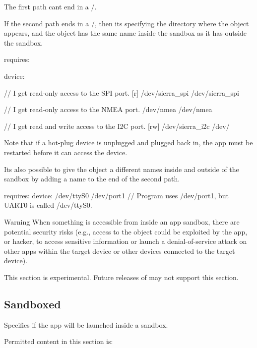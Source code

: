The first path can\textquotesingle{}t end in a \textquotesingle{}/\textquotesingle{}.

If the second path ends in a \textquotesingle{}/\textquotesingle{}, then it\textquotesingle{}s specifying the directory where the object appears, and the object has the same name inside the sandbox as it has outside the sandbox.

\begin{DoxyVerb}requires:
{
    device:
    {
        // I get read-only access to the SPI port.
        [r]     /dev/sierra_spi   /dev/sierra_spi

        // I get read-only access to the NMEA port.
                /dev/nmea         /dev/nmea

        // I get read and write access to the I2C port.
        [rw]    /dev/sierra_i2c   /dev/
    }
}
\end{DoxyVerb}


Note that if a hot-\/plug device is unplugged and plugged back in, the app must be restarted before it can access the device.

It\textquotesingle{}s also possible to give the object a different names inside and outside of the sandbox by adding a name to the end of the second path.

\begin{DoxyVerb}requires:
{
    device:
    {
        /dev/ttyS0  /dev/port1     // Program uses /dev/port1, but UART0 is called /dev/ttyS0.
    }
}
\end{DoxyVerb}


\begin{DoxyWarning}{Warning}
When something is accessible from inside an app sandbox, there are potential security risks (e.\+g., access to the object could be exploited by the app, or hacker, to access sensitive information or launch a denial-\/of-\/service attack on other apps within the target device or other devices connected to the target device).

This section is experimental. Future releases of may not support this section.
\end{DoxyWarning}
\hypertarget{def_files_adef_defFilesAdef_sandboxed}{}\subsection{Sandboxed}\label{def_files_adef_defFilesAdef_sandboxed}
Specifies if the app will be launched inside a sandbox.

Permitted content in this section is\+:


